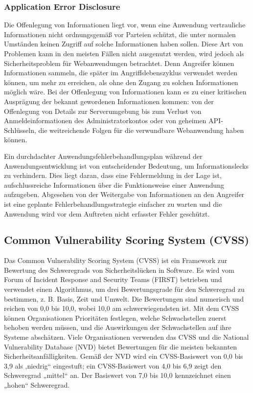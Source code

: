 \subsubsection{Application Error Disclosure}

Die Offenlegung von Informationen liegt vor, wenn eine Anwendung vertrauliche Informationen nicht ordnungsgemäß vor Parteien schützt, die unter normalen Umständen keinen Zugriff auf solche Informationen haben sollen. Diese Art von Problemen kann in den meisten Fällen nicht ausgenutzt werden, wird jedoch als Sicherheitsproblem für Webanwendungen betrachtet. Denn Angreifer können Informationen sammeln, die später im Angriffslebenszyklus verwendet werden können, um mehr zu erreichen, als ohne den Zugang zu solchen Informationen möglich wäre. Bei der Offenlegung von Informationen kann es zu einer kritischen Ausprägung der bekannt gewordenen Informationen kommen: von der Offenlegung von Details zur Serverumgebung bis zum Verlust von Anmeldeinformationen des Administratorkontos oder von geheimen API-Schlüsseln, die weitreichende Folgen für die verwundbare Webanwendung haben können\cite{infdiscissattack17}.

Ein durchdachter Anwendungsfehlerbehandlungsplan während der Anwendungsentwicklung ist von entscheidender Bedeutung, um Informationslecks zu verhindern. Dies liegt daran, dass eine Fehlermeldung in der Lage ist, aufschlussreiche Informationen über die Funktionsweise einer Anwendung aufzugeben. Abgesehen von der Weitergabe von Informationen an den Angreifer ist eine geplante Fehlerbehandlungsstrategie einfacher zu warten und die Anwendung wird vor dem Auftreten nicht erfasster Fehler geschützt\cite{ase17}.

\subsection{Common Vulnerability Scoring System (CVSS)}

Das Common Vulnerability Scoring System (CVSS) ist ein Framework zur Bewertung des Schweregrads von Sicherheitslücken in Software. Es wird vom Forum of Incident Response and Security Teams (FIRST) betrieben und verwendet einen Algorithmus, um drei Bewertungsgrade für den Schweregrad zu bestimmen, z. B. Basis, Zeit und Umwelt. Die Bewertungen sind numerisch und reichen von 0,0 bis 10,0, wobei 10,0 am schwerwiegendsten ist. Mit dem CVSS können Organisationen Prioritäten festlegen, welche Schwachstellen zuerst behoben werden müssen, und die Auswirkungen der Schwachstellen auf ihre Systeme abschätzen. Viele Organisationen verwenden das CVSS und die National Vulnerability Database (NVD) bietet Bewertungen für die meisten bekannten Sicherheitsanfälligkeiten. Gemäß der NVD wird ein CVSS-Basiswert von 0,0 bis 3,9 als ‚niedrig“ eingestuft; ein CVSS-Basiswert von 4,0 bis 6,9 zeigt den Schweregrad „mittel“ an. Der Basiswert von 7,0 bis 10,0 kennzeichnet einen „hohen“ Schweregrad\cite{cvss16}.\\

